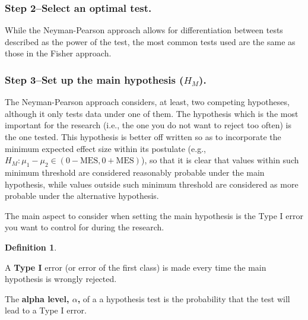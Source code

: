 \documentclass[
]{book}
\theoremstyle{definition}
\newtheorem{definition}{Definition}[chapter]
\theoremstyle{definition}
\theoremstyle{definition}
\theoremstyle{definition}
\theoremstyle{remark}
\begin{document}
\hypertarget{step-2select-an-optimal-test.}{%
\subsubsection*{Step 2--Select an optimal test.}\label{step-2select-an-optimal-test.}}

While the Neyman-Pearson approach allows for differentiation between tests described as the power of the test, the most common tests used are the same as those in the Fisher approach.

\hypertarget{step-3set-up-the-main-hypothesis-h_m.}{%
\subsubsection*{\texorpdfstring{Step 3--Set up the main hypothesis (\(H_M\)).}{Step 3--Set up the main hypothesis (H\_M).}}\label{step-3set-up-the-main-hypothesis-h_m.}}

The Neyman-Pearson approach considers, at least, two competing hypotheses, although it only tests data under one of them. The hypothesis which is the most important for the research (i.e., the one you do not want to reject too often) is the one tested. This hypothesis is better off written so as to incorporate the minimum expected effect size within its postulate (e.g., \(H_M: \mu_1-\mu_2 \in (0 - \mbox{MES}, 0 + \mbox{MES})\)), so that it is clear that values within such minimum threshold are considered reasonably probable under the main hypothesis, while values outside such minimum threshold are considered as more probable under the alternative hypothesis.

The main aspect to consider when setting the main hypothesis is the Type I error you want to control for during the research.

\begin{definition}
\protect\hypertarget{def:unlabeled-div-316}{}\label{def:unlabeled-div-316}

A \textbf{Type I} error (or error of the first class) is made every time the main hypothesis is wrongly rejected.

The \textbf{alpha level, \(\alpha\),} of a a hypothesis test is the probability that the test will lead to a Type I error.

\end{definition}
\end{document}
